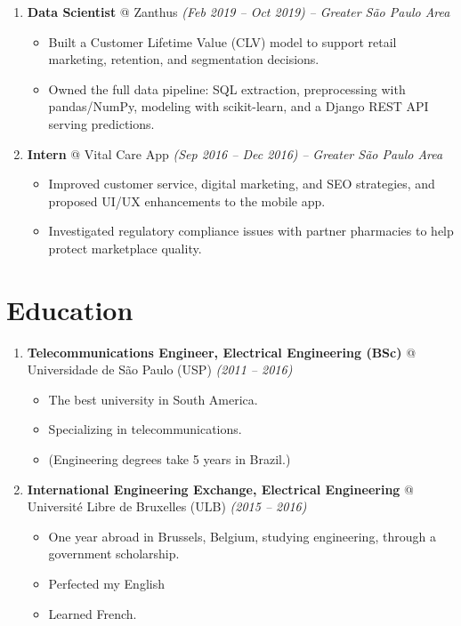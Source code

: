 \documentclass[12pt]{extarticle}
\renewcommand{\_}{\leavevmode\kern.06em\vbox{\hrule width.425em}}
\begin{document}
\begin{enumerate}
  \item \textbf{Data Scientist} @ Zanthus \textit{(Feb 2019 -- Oct 2019)} \textit{-- Greater S\~ao Paulo Area}
    \begin{itemize}
      \item Built a Customer Lifetime Value (CLV) model to support retail marketing, retention, and segmentation decisions.
      \item Owned the full data pipeline: SQL extraction, preprocessing with pandas/NumPy, modeling with scikit-learn, and a Django REST API serving predictions.
    \end{itemize}
    
  \item \textbf{Intern} @ Vital Care App \textit{(Sep 2016 -- Dec 2016)} \textit{-- Greater S\~ao Paulo Area}
    \begin{itemize}
      \item Improved customer service, digital marketing, and SEO strategies, and proposed UI/UX enhancements to the mobile app.
      \item Investigated regulatory compliance issues with partner pharmacies to help protect marketplace quality.
    \end{itemize}
\end{enumerate}

\section{Education}

\begin{enumerate}
  \item \textbf{Telecommunications Engineer, Electrical Engineering (BSc)} @ Universidade de S\~ao Paulo (USP) \textit{(2011 -- 2016)}
    \begin{itemize}
      \item The best university in South America.
      \item Specializing in telecommunications.
      \item (Engineering degrees take 5 years in Brazil.)
    \end{itemize}

  \item \textbf{International Engineering Exchange, Electrical Engineering} @ Universit\'e Libre de Bruxelles (ULB) \textit{(2015 -- 2016)}
    \begin{itemize}
      \item One year abroad in Brussels, Belgium, studying engineering, through a government scholarship.
      \item Perfected my English
      \item Learned French.
    \end{itemize}

\end{enumerate}
\end{document}
